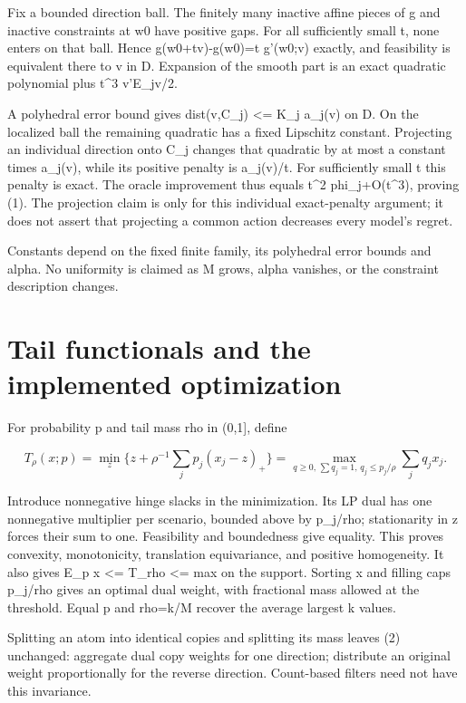 \documentclass[10pt]{article}
\begin{document}
Fix a bounded direction ball. The finitely many inactive affine pieces of g and inactive constraints at w0 have positive gaps. For all sufficiently small t, none enters on that ball. Hence g(w0+tv)-g(w0)=t g'(w0;v) exactly, and feasibility is equivalent there to v in D. Expansion of the smooth part is an exact quadratic polynomial plus t\textasciicircum{}3 v'E\_jv/2.

A polyhedral error bound gives dist(v,C\_j) <= K\_j a\_j(v) on D. On the localized ball the remaining quadratic has a fixed Lipschitz constant. Projecting an individual direction onto C\_j changes that quadratic by at most a constant times a\_j(v), while its positive penalty is a\_j(v)/t. For sufficiently small t this penalty is exact. The oracle improvement thus equals t\textasciicircum{}2 phi\_j+O(t\textasciicircum{}3), proving (1). The projection claim is only for this individual exact-penalty argument; it does not assert that projecting a common action decreases every model's regret.

Constants depend on the fixed finite family, its polyhedral error bounds and alpha. No uniformity is claimed as M grows, alpha vanishes, or the constraint description changes.

\section{Tail functionals and the implemented optimization}

For probability p and tail mass rho in (0,1], define

\begin{equation}
T_\rho(x;p)=\min_z\{z+\rho^{-1}\sum_jp_j(x_j-z)_+\}
=\max_{q\ge0,\,\sum q_j=1,\,q_j\le p_j/\rho}\sum_jq_jx_j.\tag{2}
\end{equation}



Introduce nonnegative hinge slacks in the minimization. Its LP dual has one nonnegative multiplier per scenario, bounded above by p\_j/rho; stationarity in z forces their sum to one. Feasibility and boundedness give equality. This proves convexity, monotonicity, translation equivariance, and positive homogeneity. It also gives E\_p x <= T\_rho <= max on the support. Sorting x and filling caps p\_j/rho gives an optimal dual weight, with fractional mass allowed at the threshold. Equal p and rho=k/M recover the average largest k values.

Splitting an atom into identical copies and splitting its mass leaves (2) unchanged: aggregate dual copy weights for one direction; distribute an original weight proportionally for the reverse direction. Count-based filters need not have this invariance.
\end{document}
